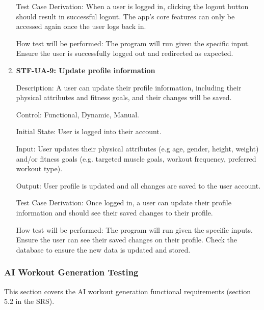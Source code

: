 \documentclass[12pt, titlepage]{article}
\begin{document}
\begin{enumerate}
        Test Case Derivation: When a user is logged in, clicking the logout button should result in successful logout. The app’s core features can only be accessed again once the user logs back in.

        How test will be performed: The program will run given the specific input. Ensure the user is successfully logged out and redirected as expected.

        \item{\textbf{STF-UA-9: Update profile information}\\}

        Description: A user can update their profile information, including their physical attributes and fitness goals, and their changes will be saved.

        Control: Functional, Dynamic, Manual.

        Initial State: User is logged into their account.

        Input: User updates their physical attributes (e.g age, gender, height, weight) and/or fitness goals (e.g. targeted muscle goals, workout frequency, preferred workout type).

        Output: User profile is updated and all changes are saved to the user account.

        Test Case Derivation: Once logged in, a user can update their profile information and should see their saved changes to their profile.

        How test will be performed: The program will run given the specific inputs. Ensure the user can see their saved changes on their profile. Check the database to ensure the new data is updated and stored.

    \end{enumerate}

    \subsubsection{AI Workout Generation Testing}
    This section covers the AI workout generation functional requirements (section 5.2 in the SRS).
\end{document}
